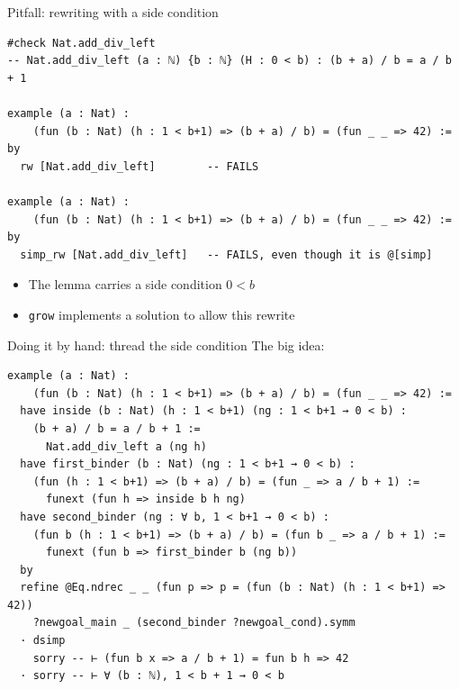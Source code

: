 \documentclass[aspectratio=169]{beamer}
\newcommand{\grow}{\texttt{grow}}      %
\begin{document}
\begin{frame}[fragile]{Pitfall: rewriting with a side condition}
\begin{lstlisting}[basicstyle=\ttfamily\scriptsize]
#check Nat.add_div_left
-- Nat.add_div_left (a : ℕ) {b : ℕ} (H : 0 < b) : (b + a) / b = a / b + 1

example (a : Nat) :
    (fun (b : Nat) (h : 1 < b+1) => (b + a) / b) = (fun _ _ => 42) := by
  rw [Nat.add_div_left]        -- FAILS

example (a : Nat) :
    (fun (b : Nat) (h : 1 < b+1) => (b + a) / b) = (fun _ _ => 42) := by
  simp_rw [Nat.add_div_left]   -- FAILS, even though it is @[simp]
\end{lstlisting}
  \begin{itemize}
    \item The lemma carries a \alert{side condition} $0 < b$
    \item \grow{} implements a solution to allow this rewrite
  \end{itemize}
\end{frame}

\begin{frame}[fragile]{Doing it by hand: thread the side condition}
The big idea:
\begin{lstlisting}[basicstyle=\ttfamily\scriptsize]
example (a : Nat) :
    (fun (b : Nat) (h : 1 < b+1) => (b + a) / b) = (fun _ _ => 42) :=
  have inside (b : Nat) (h : 1 < b+1) (ng : 1 < b+1 → 0 < b) :
    (b + a) / b = a / b + 1 :=
      Nat.add_div_left a (ng h)
  have first_binder (b : Nat) (ng : 1 < b+1 → 0 < b) :
    (fun (h : 1 < b+1) => (b + a) / b) = (fun _ => a / b + 1) :=
      funext (fun h => inside b h ng)
  have second_binder (ng : ∀ b, 1 < b+1 → 0 < b) :
    (fun b (h : 1 < b+1) => (b + a) / b) = (fun b _ => a / b + 1) :=
      funext (fun b => first_binder b (ng b))
  by
  refine @Eq.ndrec _ _ (fun p => p = (fun (b : Nat) (h : 1 < b+1) => 42))
    ?newgoal_main _ (second_binder ?newgoal_cond).symm
  · dsimp
    sorry -- ⊢ (fun b x => a / b + 1) = fun b h => 42
  · sorry -- ⊢ ∀ (b : ℕ), 1 < b + 1 → 0 < b
\end{lstlisting}

\end{frame}
\end{document}
